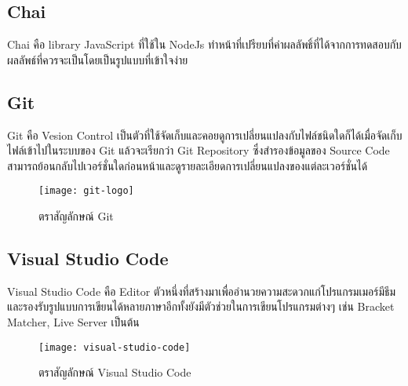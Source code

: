     \subsection{Chai}
        Chai คือ library JavaScript ที่ใช้ใน NodeJs ทำหน้าที่เปรียบที่ค่าผลลัพธิ์ที่ได้จากการทดสอบกับผลลัพธ์ที่ควรจะเป็นโดยเป็นรูปแบบที่เข้าใจง่าย

    \subsection{Git}
        Git คือ Vesion Control เป็นตัวที่ใช้จัดเก็บและคอยดูการเปลี่ยนแปลงกับไฟล์ชนิดใดก็ได้เมื่อจัดเก็บไฟล์เข้าไปในระบบของ Git แล้วจะเรียกว่า Git Repository ซึ่งสำรองข้อมูลของ Source Code สามารถย้อนกลับไปเวอร์ชั่นใดก่อนหน้าและดูรายละเอียดการเปลี่ยนแปลงของแต่ละเวอร์ชั่นได้

        \begin{figure}[H]
            \centering
            \texttt{[image: git-logo]}
            \caption{ตราสัญลักษณ์ Git}\label{git-logo}
        \end{figure}

    \subsection{Visual Studio Code}
        Visual Studio Code คือ Editor ตัวหนึ่งที่สร้างมาเพื่ออำนวยความสะดวกแก่โปรแกรมเมอร์มีธีมและรองรับรูปแบบการเขียนได้หลายภาษาอีกทั้งยังมีตัวช่วยในการเขียนโปรแกรมต่างๆ เช่น Bracket Matcher, Live Server เป็นต้น

        \begin{figure}[H]
            \centering
            \texttt{[image: visual-studio-code]}
            \caption{ตราสัญลักษณ์ Visual Studio Code}\label{visual-studio-code}
        \end{figure}